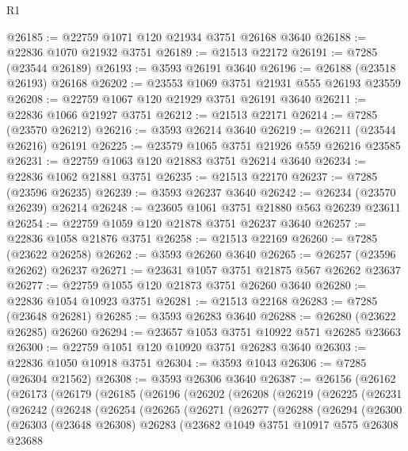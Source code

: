 \begin{lexlean}{R1}
\begin{coremodule}
@26185 := @22759 @1071 @120 @21934 @3751 @26168 @3640
@26188 := @22836 @1070 @21932 @3751
@26189 := @21513 @22172
@26191 := @7285 (@23544 @26189)
@26193 := @3593 @26191 @3640
@26196 := @26188 (@23518 @26193) @26168
@26202 := @23553 @1069 @3751 @21931 @555 @26193 @23559
@26208 := @22759 @1067 @120 @21929 @3751 @26191 @3640
@26211 := @22836 @1066 @21927 @3751
@26212 := @21513 @22171
@26214 := @7285 (@23570 @26212)
@26216 := @3593 @26214 @3640
@26219 := @26211 (@23544 @26216) @26191
@26225 := @23579 @1065 @3751 @21926 @559 @26216 @23585
@26231 := @22759 @1063 @120 @21883 @3751 @26214 @3640
@26234 := @22836 @1062 @21881 @3751
@26235 := @21513 @22170
@26237 := @7285 (@23596 @26235)
@26239 := @3593 @26237 @3640
@26242 := @26234 (@23570 @26239) @26214
@26248 := @23605 @1061 @3751 @21880 @563 @26239 @23611
@26254 := @22759 @1059 @120 @21878 @3751 @26237 @3640
@26257 := @22836 @1058 @21876 @3751
@26258 := @21513 @22169
@26260 := @7285 (@23622 @26258)
@26262 := @3593 @26260 @3640
@26265 := @26257 (@23596 @26262) @26237
@26271 := @23631 @1057 @3751 @21875 @567 @26262 @23637
@26277 := @22759 @1055 @120 @21873 @3751 @26260 @3640
@26280 := @22836 @1054 @10923 @3751
@26281 := @21513 @22168
@26283 := @7285 (@23648 @26281)
@26285 := @3593 @26283 @3640
@26288 := @26280 (@23622 @26285) @26260
@26294 := @23657 @1053 @3751 @10922 @571 @26285 @23663
@26300 := @22759 @1051 @120 @10920 @3751 @26283 @3640
@26303 := @22836 @1050 @10918 @3751
@26304 := @3593 @1043
@26306 := @7285 (@26304 @21562)
@26308 := @3593 @26306 @3640
@26387 := @26156
    (@26162
      (@26173
        (@26179
          (@26185
            (@26196
              (@26202
                (@26208
                  (@26219
                    (@26225
                      (@26231
                        (@26242
                          (@26248
                            (@26254
                              (@26265
                                (@26271
                                  (@26277
                                    (@26288
                                      (@26294
                                        (@26300
                                          (@26303
                                            (@23648 @26308)
                                            @26283
                                            (@23682
                                              @1049
                                              @3751
                                              @10917
                                              @575
                                              @26308
                                              @23688

\end{coremodule}
\end{lexlean}
